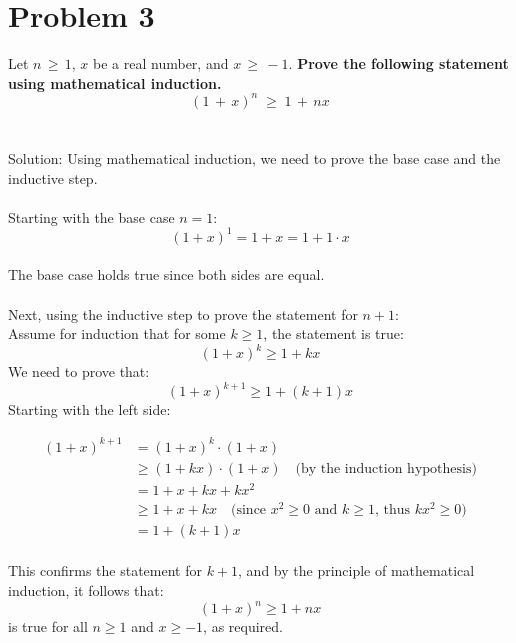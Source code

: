 \documentclass{amsart}
\theoremstyle{definition}
\theoremstyle{Exercise}
\theoremstyle{remark}
\theoremstyle{rule}
\numberwithin{equation}{section}
\begin{document}
  \section*{}
  \section*{Problem 3}
  Let $n\, \geq \, 1$, $x$ be a real number, and $x\, \geq\,-1$. {\bf Prove the following statement using mathematical induction.}
  \[(1\,+\,x)^n\;\geq\;1\,+\,nx\]
\\\\
Solution: Using mathematical induction, we need to prove the base case and the inductive step.
\\\\
Starting with the base case \(n = 1\): 
\[(1 + x)^1 = 1 + x = 1 + 1 \cdot x\]\\
The base case holds true since both sides are equal.
\\\\
Next, using the inductive step to prove the statement for \(n + 1\):
\\
Assume for induction that for some \(k \geq 1\), the statement is true:\\
\[(1 + x)^k \geq 1 + kx\]
We need to prove that:\\
\[(1 + x)^{k + 1} \geq 1 + (k + 1)x\]
Starting with the left side:

\begin{align*}
(1 + x)^{k + 1} &= (1 + x)^k \cdot (1 + x) \\
&\geq (1 + kx) \cdot (1 + x) \quad \text{(by the induction hypothesis)} \\
&= 1 + x + kx + kx^2 \\
&\geq 1 + x + kx \quad \text{(since \(x^2 \geq 0\) and \(k \geq 1\), thus \(kx^2 \geq 0\))} \\
&= 1 + (k + 1)x
\end{align*}
\\
This confirms the statement for \(k + 1\), and by the principle of mathematical induction, it follows that:
\[(1 + x)^n \geq 1 + nx\]
is true for all \(n \geq 1\) and \(x \geq -1\), as required.
\\\\
\newpage
  \section*{}
\end{document}
